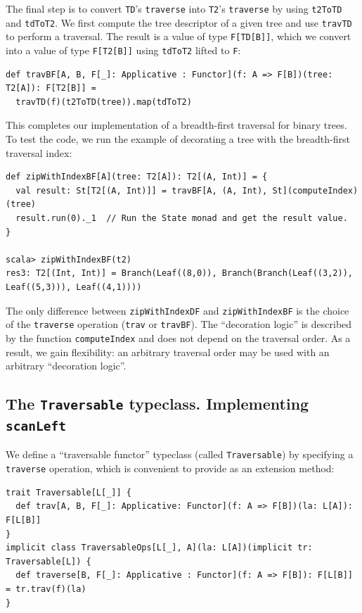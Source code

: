 The final step is to convert \lstinline!TD!\textsf{'}s \lstinline!traverse!
into \lstinline!T2!\textsf{'}s \lstinline!traverse! by using \lstinline!t2ToTD!
and \lstinline!tdToT2!. We first compute the tree descriptor of a
given tree and use \lstinline!travTD! to perform a traversal. The
result is a value of type \lstinline!F[TD[B]]!, which we convert
into a value of type \lstinline!F[T2[B]]! using \lstinline!tdToT2!
lifted to \lstinline!F!:
\begin{lstlisting}
def travBF[A, B, F[_]: Applicative : Functor](f: A => F[B])(tree: T2[A]): F[T2[B]] =
  travTD(f)(t2ToTD(tree)).map(tdToT2) 
\end{lstlisting}

This completes our implementation of a breadth-first traversal for
binary trees. To test the code, we run the example of decorating a
tree with the breadth-first traversal index:
\begin{lstlisting}
def zipWithIndexBF[A](tree: T2[A]): T2[(A, Int)] = {
  val result: St[T2[(A, Int)]] = travBF[A, (A, Int), St](computeIndex)(tree)
  result.run(0)._1  // Run the State monad and get the result value.
}

scala> zipWithIndexBF(t2)
res3: T2[(Int, Int)] = Branch(Leaf((8,0)), Branch(Branch(Leaf((3,2)), Leaf((5,3))), Leaf((4,1))))
\end{lstlisting}

The only difference between \lstinline!zipWithIndexDF! and \lstinline!zipWithIndexBF!
is the choice of the \lstinline!traverse! operation (\lstinline!trav!
or \lstinline!travBF!). The \textsf{``}decoration logic\textsf{''} is described by
the function \lstinline!computeIndex! and does not depend on the
traversal order. As a result, we gain flexibility: an arbitrary traversal
order may be used with an arbitrary \textsf{``}decoration logic\textsf{''}. 

\subsection{The \texttt{Traversable} typeclass. Implementing \texttt{scanLeft}}

We define a \textsf{``}traversable functor\textsf{''} typeclass (called \lstinline!Traversable!)
by specifying a \lstinline!traverse! operation, which is convenient
to provide as an extension method:
\begin{lstlisting}
trait Traversable[L[_]] {
  def trav[A, B, F[_]: Applicative: Functor](f: A => F[B])(la: L[A]): F[L[B]]
}
implicit class TraversableOps[L[_], A](la: L[A])(implicit tr: Traversable[L]) {
  def traverse[B, F[_]: Applicative : Functor](f: A => F[B]): F[L[B]] = tr.trav(f)(la)
}
\end{lstlisting}

